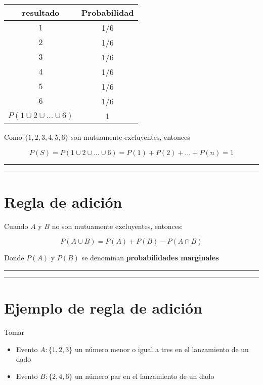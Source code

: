 \documentclass[
]{book}
\providecommand{\tightlist}{%
  \setlength{\itemsep}{0pt}\setlength{\parskip}{0pt}}
\begin{document}
\begin{longtable}[]{@{}cc@{}}
\toprule
resultado & Probabilidad \\
\midrule
\endhead
\(1\) & 1/6 \\
\(2\) & 1/6 \\
\(3\) & 1/6 \\
\(4\) & 1/6 \\
\(5\) & 1/6 \\
\(6\) & 1/6 \\
\(P(1\cup 2\cup ...\cup 6)\) & 1 \\
\bottomrule
\end{longtable}

Como \(\{1,2,3,4,5,6\}\) son mutuamente excluyentes, entonces

\[P(S)=P(1\cup 2\cup ...\cup 6) = P(1)+P(2)+ ...+P(n)=1\]

\begin{center}\rule{0.5\linewidth}{0.5pt}\end{center}

\begin{center}\rule{0.5\linewidth}{0.5pt}\end{center}

\hypertarget{regla-de-adiciuxf3n}{%
\section{Regla de adición}\label{regla-de-adiciuxf3n}}

Cuando \(A\) y \(B\) no son mutuamente excluyentes, entonces:

\[P(A\cup B)=P(A) + P(B) - P(A\cap B)\]

Donde \(P(A)\) y \(P(B)\) se denominan \textbf{probabilidades marginales}

\begin{center}\rule{0.5\linewidth}{0.5pt}\end{center}

\begin{center}\rule{0.5\linewidth}{0.5pt}\end{center}

\hypertarget{ejemplo-de-regla-de-adiciuxf3n}{%
\section{Ejemplo de regla de adición}\label{ejemplo-de-regla-de-adiciuxf3n}}

Tomar

\begin{itemize}
\tightlist
\item
  Evento \(A:\{1,2,3\}\) un número menor o igual a tres en el lanzamiento de un dado
\item
  Evento \(B:\{2,4,6\}\) un número par en el lanzamiento de un dado
\end{itemize}
\end{document}

